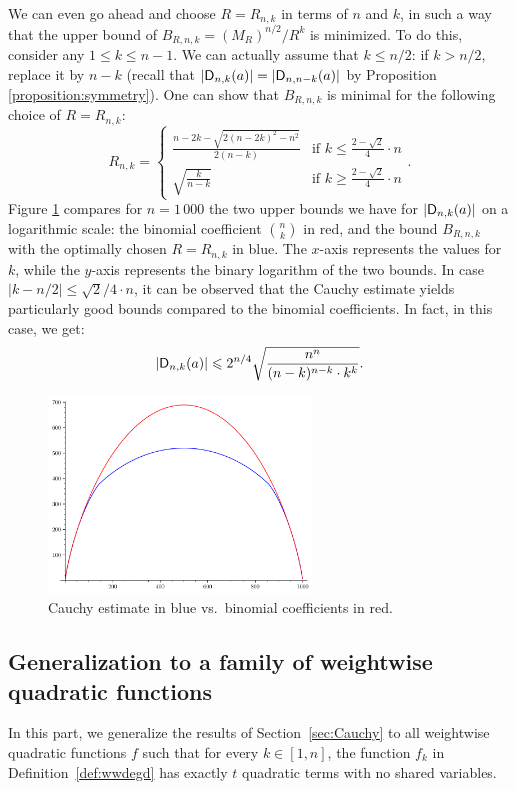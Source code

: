 \documentclass[11pt]{llncs}
\begin{document}
{\begin{remark}
    We can even go ahead and choose $R=R_{n,k}$ in terms of $n$ and $k$, in such a way that the upper bound of $B_{R,n,k}=(M_R)^{n/2}/R^k$ is minimized. To do this, consider any $1\leq k\leq n-1$. We can actually assume that $k\leq n/2$: if $k>n/2$, replace it by $n-k$ (recall that $|\mathsf{D}_{n,k}(a)|=|\mathsf{D}_{n,n-k}(a)|$ by Proposition \ref{proposition:symmetry}). One can show that $B_{R,n,k}$ is minimal for the following choice of $R=R_{n,k}$:
    \[
        R_{n,k}=\begin{cases}
            \frac{n-2k-\sqrt{2(n-2k)^2-n^2}}{2(n-k)}&\text{if $k\leq\frac{2-\sqrt 2}{4}\cdot n$}\\
            \sqrt{\frac{k}{n-k}}&\text{if $k\geq\frac{2-\sqrt 2}{4}\cdot n$}
        \end{cases}.
    \]
    Figure \ref{fig:cauchy_estimate} compares for $n=1\,000$ the two upper bounds we have for $|\mathsf{D}_{n,k}(a)|$ on a logarithmic scale: the binomial coefficient $\binom nk$ in red, and the bound $B_{R,n,k}$ with the optimally chosen $R=R_{n,k}$ in blue. The $x$-axis represents the values for $k$, while the $y$-axis represents the binary logarithm of the two bounds. In case $|k-n/2|\leq\sqrt{2}/4\cdot n$, it can be observed that the Cauchy estimate yields particularly good bounds compared to the binomial coefficients. In fact, in this case, we get:
    \[
        |\mathsf{D}_{n,k}(a)|\leqslant 2^{n/4}\sqrt{\frac{n^n}{(n-k)^{n-k}\cdot k^k}}.
    \]
    \begin{figure}
        \centering
        \includegraphics[width=7cm]{cauchy_estimate.pdf}
        \caption{Cauchy estimate in blue vs.\ binomial coefficients in red.}
        \label{fig:cauchy_estimate}
    \end{figure}
\end{remark}}




\subsection{Generalization to a family of weightwise quadratic functions}\label{sec:general}
In this part, we generalize the results of Section~\ref{sec:Cauchy} to all weightwise quadratic functions $f$ such that for every $k\in [1,n]$, the function $f_k$ in Definition~\ref{def:wwdegd} has exactly $t$ quadratic terms with no shared variables.
\end{document}
